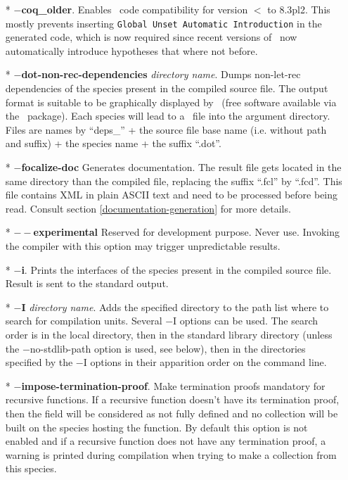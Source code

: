 \begin{itemize}
  \item[*] {\bf $-$coq_older}.
    Enables \coq\ code compatibility for version $<$ to 8.3pl2. This
    mostly prevents inserting {\tt Global Unset Automatic
      Introduction} in the generated code, which is now required since
    recent versions of \coq\ now automatically introduce hypotheses
    that where not before.
  \item[*] {\bf $-$dot-non-rec-dependencies} {\em directory name}.
    Dumps non-let-rec dependencies of the species present in the
    compiled source file. The output format is suitable to be
    graphically displayed by \dotty\ (free software available via the
    \graphviz\ package). Each species will lead to a \dotty\ file into
    the argument directory. Files are names by ``deps\_'' + the source
    file base name (i.e. without path and suffix) + the species name +
    the suffix ``.dot''.

  \item[*] {\bf $-$focalize-doc} Generates documentation. The
    result file gets located in the same directory than the compiled
    file, replacing the suffix ``.fcl'' by ``.fcd''. This file contains
    XML in plain ASCII text and need to be processed before being read.
    Consult section \ref{documentation-generation} for more details.

  \item[*] {\bf $--$experimental} Reserved for development purpose.
    Never use. Invoking the compiler with this option may trigger
    unpredictable results.

  \item[*] {\bf $-$i}. Prints the interfaces of the species present in
    the compiled source file. Result is sent to the standard output.

  \item[*] {\bf $-$I} {\em directory name}. Adds the specified
    directory to the path list where to search for
    compilation units. Several $-$I options can be used. The search order is
    in the local directory, then in the standard library directory (unless the
    $-$no-stdlib-path option is used, see below), then in the
    directories specified by the $-$I options in their apparition
    order on the command line.

  \item[*] {\bf $-$impose-termination-proof}. Make termination proofs
    mandatory for recursive functions. If a recursive function doesn't
    have its termination proof, then the field will be considered as
    not fully defined and no collection will be built on the
    species hosting the function. By default this option is not
    enabled and if a recursive function does not have any termination
    proof, a warning is printed during compilation when trying to make
    a collection from this species.


\end{itemize}
